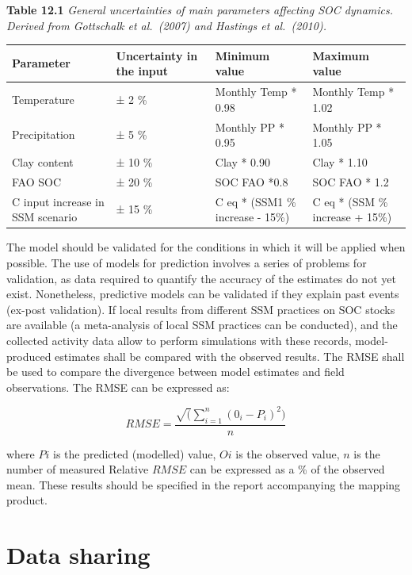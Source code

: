 \documentclass[
  10pt,
  b5paper,
]{book}
\begin{document}
\textbf{Table 12.1} \emph{General uncertainties of main parameters affecting SOC dynamics. Derived from Gottschalk et al.~(2007) and Hastings et al.~(2010).}

\begin{table}
\centering
\begin{tabular}{l|l|l|l}
\hline
Parameter & Uncertainty in the input & Minimum value & Maximum value\\
\hline
Temperature & ± 2 \% & Monthly Temp * 0.98 & Monthly Temp * 1.02\\
\hline
Precipitation & ± 5 \% & Monthly PP * 0.95 & Monthly PP * 1.05\\
\hline
Clay content & ± 10 \% & Clay * 0.90 & Clay * 1.10\\
\hline
FAO SOC & ± 20 \% & SOC FAO *0.8 & SOC FAO *  1.2\\
\hline
C input increase in SSM scenario & ± 15 \% & C eq * (SSM1 \% increase - 15\%) & C eq * (SSM \% increase + 15\%)\\
\hline
\end{tabular}
\end{table}

The model should be validated for the conditions in which it will be applied when possible. The use of models for prediction involves a series of problems for validation, as data required to quantify the accuracy of the estimates do not yet exist. Nonetheless, predictive models can be validated if they explain past events (ex-post validation). If local results from different SSM practices on SOC stocks are available (a meta-analysis of local SSM practices can be conducted), and the collected activity data allow to perform simulations with these records, model-produced estimates shall be compared with the observed results. The RMSE shall be used to compare the divergence between model estimates and field observations. The RMSE can be expressed as:

\begin{equation}
\tag{12.8}
RMSE = \frac{\sqrt(\sum_{i=1}^n (0_i - P_i)^2)}{n}
\end{equation}

where \(Pi\) is the predicted (modelled) value, \(Oi\) is the observed value, \(n\) is the number of measured
Relative \(RMSE\) can be expressed as a \% of the observed mean. These results should be specified in the report accompanying the mapping product.

\hypertarget{data-sharing}{%
\chapter{\textbar{} Data sharing}\label{data-sharing}}
\end{document}
